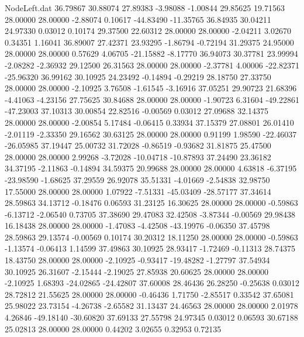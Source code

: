 \begin{filecontents}{NodeLeft.dat}
  36.79867   30.88074   27.89383    -3.98088   -1.00844   29.85625   19.71563   28.00000   28.00000   -2.88074    0.10617  -44.83490  -11.35765
  36.84935   30.04211   24.97330     0.03012    0.10174   29.37500   22.60312   28.00000   28.00000   -2.04211    3.02670    0.34351    1.16041
  36.89007   27.42371   23.93295    -1.86794   -0.72194   31.29375   24.95000   28.00000   28.00000    0.57629    4.06705  -21.15882   -8.17770
  36.94073   30.37781   23.99994    -2.08282   -2.36932   29.12500   26.31563   28.00000   28.00000   -2.37781    4.00006  -22.82371  -25.96320
  36.99162   30.10925   24.23492    -0.14894   -0.29219   28.18750   27.33750   28.00000   28.00000   -2.10925    3.76508   -1.61545   -3.16916
  37.05251   29.90723   21.68396    -4.41063   -4.23156   27.75625   30.84688   28.00000   28.00000   -1.90723    6.31604  -49.22861  -47.23003
  37.10313   30.00854   22.82516    -0.00569    0.03012   27.09688   32.14375   28.00000   28.00000   -2.00854    5.17484   -0.06415    0.33934
  37.15379   27.08801   26.01410    -2.01119   -2.33350   29.16562   30.63125   28.00000   28.00000    0.91199    1.98590  -22.46037  -26.05985
  37.19447   25.00732   31.72028    -0.86519   -0.93682   31.81875   25.47500   28.00000   28.00000    2.99268   -3.72028  -10.04718  -10.87893
  37.24490   23.36182   34.37195    -2.11863   -0.14894   34.59375   20.99688   28.00000   28.00000    4.63818   -6.37195  -23.98590   -1.68625
  37.29559   26.92078   35.51331    -4.01669   -2.54838   32.98750   17.55000   28.00000   28.00000    1.07922   -7.51331  -45.03409  -28.57177
  37.34614   28.59863   34.13712    -0.18476    0.06593   31.23125   16.30625   28.00000   28.00000   -0.59863   -6.13712   -2.06540    0.73705
  37.38690   29.47083   32.42508    -3.87344   -0.00569   29.98438   16.18438   28.00000   28.00000   -1.47083   -4.42508  -43.19976   -0.06350
  37.45798   28.59863   29.13574    -0.00569    0.10174   30.20312   18.11250   28.00000   28.00000   -0.59863   -1.13574   -0.06413    1.14599
  37.49863   30.10925   28.93417    -1.72469   -0.11313   28.74375   18.43750   28.00000   28.00000   -2.10925   -0.93417  -19.48282   -1.27797
  37.54934   30.10925   26.31607    -2.15444   -2.19025   27.85938   20.60625   28.00000   28.00000   -2.10925    1.68393  -24.02865  -24.42807
  37.60008   28.46436   26.28250    -0.25638    0.03012   28.72812   21.55625   28.00000   28.00000   -0.46436    1.71750   -2.85517    0.33542
  37.65081   25.98022   23.73154    -4.26738   -2.65582   31.13437   24.46563   28.00000   28.00000    2.01978    4.26846  -49.18140  -30.60820
  37.69133   27.55798   24.97345     0.03012    0.06593   30.67188   25.02813   28.00000   28.00000    0.44202    3.02655    0.32953    0.72135

\end{filecontents}

